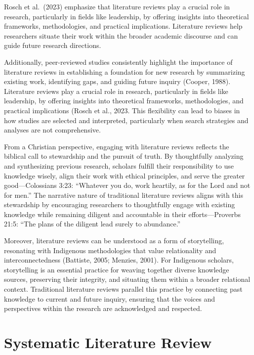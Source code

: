 \documentclass[
  letterpaper,
  DIV=11,
  numbers=noendperiod]{scrreprt}
\begin{document}
Rosch et al.~(2023) emphasize that literature reviews play a crucial
role in research, particularly in fields like leadership, by offering
insights into theoretical frameworks, methodologies, and practical
implications. Literature reviews help researchers situate their work
within the broader academic discourse and can guide future research
directions.

Additionally, peer-reviewed studies consistently highlight the
importance of literature reviews in establishing a foundation for new
research by summarizing existing work, identifying gaps, and guiding
future inquiry (Cooper, 1988). Literature reviews play a crucial role in
research, particularly in fields like leadership, by offering insights
into theoretical frameworks, methodologies, and practical implications
(Rosch et al., 2023. This flexibility can lead to biases in how studies
are selected and interpreted, particularly when search strategies and
analyses are not comprehensive.

From a Christian perspective, engaging with literature reviews reflects
the biblical call to stewardship and the pursuit of truth. By
thoughtfully analyzing and synthesizing previous research, scholars
fulfill their responsibility to use knowledge wisely, align their work
with ethical principles, and serve the greater good---Colossians 3:23:
``Whatever you do, work heartily, as for the Lord and not for men.'' The
narrative nature of traditional literature reviews aligns with this
stewardship by encouraging researchers to thoughtfully engage with
existing knowledge while remaining diligent and accountable in their
efforts---Proverbs 21:5: ``The plans of the diligent lead surely to
abundance.''

Moreover, literature reviews can be understood as a form of
storytelling, resonating with Indigenous methodologies that value
relationality and interconnectedness (Battiste, 2005; Menzies, 2001).
For Indigenous scholars, storytelling is an essential practice for
weaving together diverse knowledge sources, preserving their integrity,
and situating them within a broader relational context. Traditional
literature reviews parallel this practice by connecting past knowledge
to current and future inquiry, ensuring that the voices and perspectives
within the research are acknowledged and respected.

\section*{Systematic Literature
Review}\label{systematic-literature-review}
\end{document}
